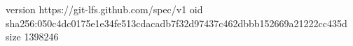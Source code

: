 version https://git-lfs.github.com/spec/v1
oid sha256:050c4dc0175e1e34fe513cdacadb7f32d97437c462dbbb152669a21222cc435d
size 1398246

